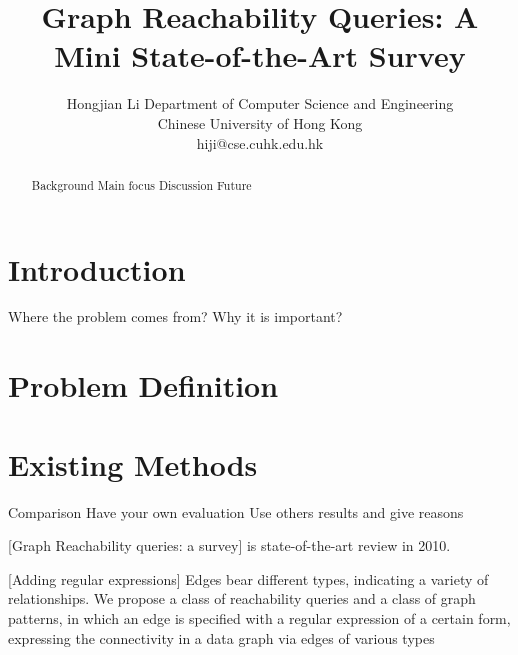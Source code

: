 \documentclass[12pt, conference, compsocconf]{../IEEEtran}
\begin{document}
\title{Graph Reachability Queries: A Mini State-of-the-Art Survey}
\author
{
\IEEEauthorblockN
{
Hongjian Li
\IEEEauthorblockA
{
Department of Computer Science and Engineering\\
Chinese University of Hong Kong\\
hiji@cse.cuhk.edu.hk
}
}
}
\maketitle

\begin{abstract}

Background
Main focus
Discussion
Future

\end{abstract}




\section{Introduction}

Where the problem comes from?
Why it is important?

\section{Problem Definition}



\section{Existing Methods}

Comparison
Have your own evaluation
Use others results and give reasons

[Graph Reachability queries: a survey] is state-of-the-art review in 2010.

[Adding regular expressions] Edges bear different types, indicating a variety of relationships. We propose a class of reachability queries and a class of graph patterns, in which an edge is specified with a regular expression of a certain form, expressing the connectivity in a data graph via edges of various types
\end{document}
